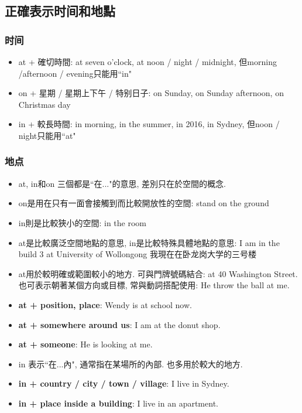 \subsection{正確表示时间和地點}
\subsubsection{时间}
\begin{itemize}
  \itemsep0em
  \item at + 確切時間: at seven o'clock, at noon / night / midnight, 但morning /afternoon / evening只能用``in"
  \item on + 星期 / 星期上下午 / 特别日子: on Sunday, on Sunday afternoon, on Christmas day
  \item in + 較長時間: in morning, in the summer, in 2016, in Sydney, 但noon / night只能用``at"
\end{itemize}

\subsubsection{地点}
\begin{itemize}
  \itemsep0em
  \item at, in和on 三個都是``在..."的意思, 差別只在於空間的概念.
  \item on是用在只有一面會接觸到而比較開放性的空間: stand on the ground
  \item in則是比較狹小的空間: in the room
  \item at是比較廣泛空間地點的意思, in是比較特殊具體地點的意思: I am in the build 3 at University of Wollongong 我現在在卧龙岗大学的三号楼
\end{itemize}

\begin{itemize}
  \itemsep0em
  \item at用於較明確或範圍較小的地方. 可與門牌號碼結合: at 40 Washington Street. 也可表示朝著某個方向或目標, 常與動詞搭配使用: He throw the ball at me.
  \item \textbf{at + position, place}: Wendy is at school now.
  \item \textbf{at + somewhere around us}: I am at the donut shop.
  \item \textbf{at + someone}: He is looking at me.
\end{itemize}

\begin{itemize}
  \itemsep0em
  \item in 表示``在...內", 通常指在某場所的內部. 也多用於較大的地方.
  \item \textbf{in + country / city / town / village}: I live in Sydney.
  \item \textbf{in + place inside a building}: I live in an apartment.
\end{itemize}


